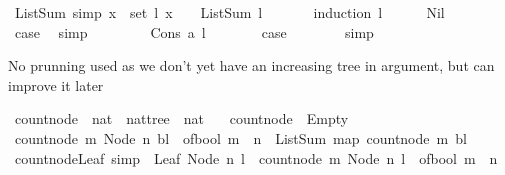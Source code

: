 \begin{isabellebody}
\ ListSum{\isacharunderscore}{}\ {\isacharbrackleft}simp{\isacharbrackright}\ {\isacharcolon}{\isachardoublequoteopen}{\isacharparenleft}{\isasymforall}x\ {\isasymin}\ set\ l{\isachardot}\ x\ {\isacharequal}\ {}{\isacharparenright}\ {\isasymlongrightarrow}\ ListSum\ l\ {\isacharequal}\ {}{\isachardoublequoteclose}\ \isanewline
%
\isadelimproof
\ \ %
\endisadelimproof
%
\isatagproof
{}\isamarkupfalse%
\ {\isacharparenleft}induction\ l{\isacharparenright}\isanewline
\ \ \ \ \isamarkupfalse%
\ Nil\isanewline
\ \ \ \ \isamarkupfalse%
\ \isamarkupfalse%
\ {\isacharquery}case\ \isamarkupfalse%
\ simp\isanewline
\ \ \isamarkupfalse%
\isanewline
\ \ \ \ \isamarkupfalse%
\ {\isacharparenleft}Cons\ a\ l{\isacharparenright}\isanewline
\ \ \ \ \isamarkupfalse%
\ \isamarkupfalse%
\ {\isacharquery}case\isanewline
\ \ \ \ \ \ \isamarkupfalse%
\ simp\ \isanewline
\ \ \isamarkupfalse%
%
\endisatagproof
{\isafoldproof}%
%
\isadelimproof
%
\endisadelimproof
%
\begin{isamarkuptext}%
No prunning used as we don't yet have an increasing tree in argument, but can improve it later%
\end{isamarkuptext}\isamarkuptrue%
\isamarkupfalse%
\ count{\isacharunderscore}node\ {\isacharcolon}{\isacharcolon}\ {\isachardoublequoteopen}nat\ {\isasymRightarrow}\ nattree\ {\isasymRightarrow}\ nat{\isachardoublequoteclose}\ \isanewline
\ \ {\isachardoublequoteopen}count{\isacharunderscore}node\ {\isacharunderscore}\ Empty\ {\isacharequal}\ {}{\isachardoublequoteclose}\isanewline
{\isacharbar}\ {\isachardoublequoteopen}count{\isacharunderscore}node\ m\ {\isacharparenleft}Node\ n\ bl{\isacharparenright}\ {\isacharequal}\ {\isacharparenleft}of{\isacharunderscore}bool\ {\isacharparenleft}m\ {\isacharequal}\ n{\isacharparenright}{\isacharparenright}\ {\isacharplus}\ ListSum\ {\isacharparenleft}map\ {\isacharparenleft}count{\isacharunderscore}node\ m{\isacharparenright}\ bl{\isacharparenright}{\isachardoublequoteclose}\isanewline
\isanewline
{}\isamarkupfalse%
\ count{\isacharunderscore}node{\isacharunderscore}Leaf\ {\isacharbrackleft}simp{\isacharbrackright}\ {\isacharcolon}\ {\isachardoublequoteopen}Leaf\ {\isacharparenleft}Node\ n\ l{\isacharparenright}\ {\isasymlongrightarrow}\ count{\isacharunderscore}node\ m\ {\isacharparenleft}Node\ n\ l{\isacharparenright}\ {\isacharequal}\ of{\isacharunderscore}bool\ {\isacharparenleft}m\ {\isacharequal}\ n{\isacharparenright}{\isachardoublequoteclose}\isanewline

\end{isabellebody}
